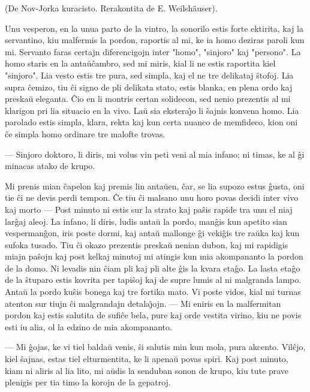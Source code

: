 \begin{center}
\footnotesize (De Nov-Jorka kuracisto. Rerakontita de E. Weilshäuser).
\end{center}

   Unu vesperon, en la unua parto de la vintro, la sonorilo estis
forte ektirita, kaj la servantino, kiu malfermis la pordon, raportis
al mi, ke ia homo deziras paroli kun mi. Servanto faras certajn
diferencigojn inter "homo", "sinjoro" kaj "persono". La homo
staris en la anta\u u\^cambro, sed mi miris, kial li ne estis
raportita kiel "sinjoro". Lia vesto estis tre pura, sed simpla,
kaj el ne tre delikataj \^stofoj. Lia supra \^cemizo, tiu \^ci signo
de pli delikata stato, estis blanka, en plena ordo kaj preska\u u
eleganta. \^Cio en li montris certan solidecon, sed nenio prezentis
al mi klarigon pri lia situacio en la vivo. La\u u sia
ekstera\^{\j}o li \^sajnis konvena homo. Lia parolado estis simpla,
klara, rekta kaj kun certa nuanco de memfideco, kion oni \^ce simpla
homo ordinare tre malofte trovas.

 --- Sinjoro doktoro, li diris, mi volus vin peti veni al mia infano;
ni timas, ke al \^gi minacas atako de krupo.

   Mi prenis mian \^capelon kaj premis lin anta\u uen, \^car, se lia supozo
estus \^gusta, oni tie \^ci ne devis perdi tempon. \^Ce tiu \^ci
malsano unu horo povas decidi inter vivo kaj morto --- Post minuto
ni estis sur la strato kaj pa\^sis rapide tra unu el niaj lar\^gaj
aleoj. La infano, li diris, ludis anta\u u la pordo, man\^gis kun
apetito sian vesperman\^gon, iris poste dormi, kaj anta\u u mallonge
\^gi veki\^gis tre ra\u uka kaj kun sufoka tusado. Tiu \^ci okazo
prezentis preska\u u nenian dubon, kaj mi rapidigis miajn pa\^sojn
kaj post kelkaj minutoj mi atingis kun mia akompananto la pordon de
la domo. Ni levadis nin \^ciam pli kaj pli alte \^gis la kvara
eta\^go. La lasta eta\^go de la \^stuparo estis kovrita per
tapi\^soj kaj de supre lumis al ni malgranda lampo. Anta\u u la
pordo ku\^sis bonega kaj tre fortika mato. Vi poste vidos, kial mi
turnas atenton sur tiujn \^ci malgrandajn detala\^{\j}ojn. --- Mi
eniris en la malfermitan pordon kaj estis salutita de sufi\^ce bela,
pure kaj orde vestita virino, kiu ne povis esti iu alia, ol la
edzino de mia akompananto.

 --- Mi \^gojas, ke vi tiel balda\u u venis, \^si salutis min kun mola,
pura akcento. Vil\^cjo, kiel \^sajnas, estas tiel elturmentita, ke
li apena\u u povas spiri. Kaj post minuto, kiam ni aliris al lia
lito, mi a\u udis la senduban sonon de krupo, kiu tute prave
plenigis per tia timo la korojn de la gepatroj.

